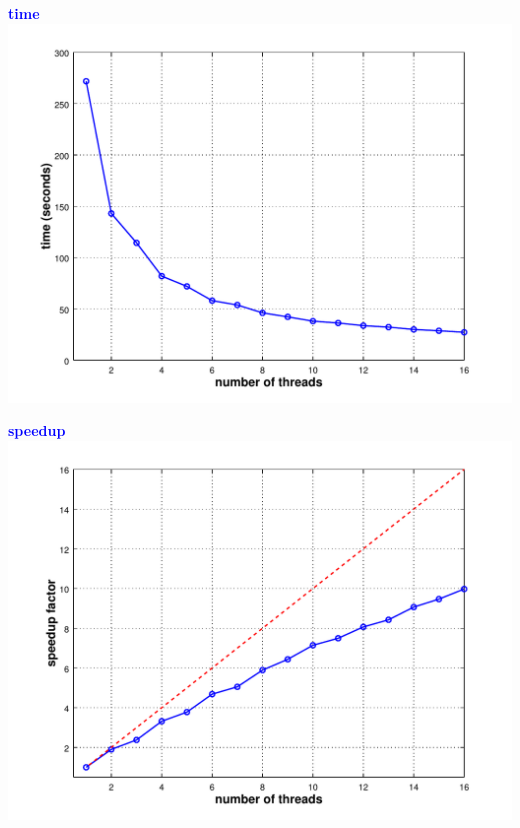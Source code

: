 \documentclass[usenames,dvipsnames]{beamer}
\begin{document}
\begin{frame}
\centering
\begin{minipage}{\textwidth}
  \centering
  \begin{minipage}{0.38\textwidth}
    \centering
    {\tiny\bf\textcolor{blue}{time}}\\
    \vspace{-1ex}
    \includegraphics[width=1.1\textwidth]{plot1.pdf}
  \end{minipage}%
  \begin{minipage}{0.38\textwidth}
    \centering
    {\tiny\bf\textcolor{blue}{speedup}}\\
    \vspace{-1ex}
    \includegraphics[width=1.1\textwidth]{plot2.pdf}
  \end{minipage}
\end{minipage}


\end{frame}
\end{document}
